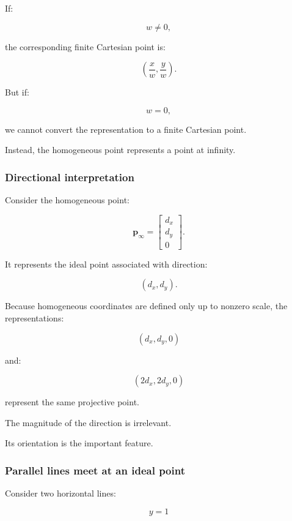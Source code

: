 If:

\[
 w\ne0,
\]

the corresponding finite Cartesian point is:

\[
 \boxed{ \left(\frac xw,\frac yw\right) }.
\]

But if:

\[
 \boxed{w=0},
\]

we cannot convert the representation to a finite Cartesian point.

Instead, the homogeneous point represents a point at infinity.

\subsubsection{Directional interpretation}\label{02-foundations-ii-ch032-directional-interpretation}

\hypertarget{02-foundations-ii-ch032-directional-interpretation}{}

Consider the homogeneous point:

\[
 \boxed{ \mathbf p_\infty= \begin{bmatrix} d_x\\d_y\\0 \end{bmatrix} }.
\]

It represents the ideal point associated with direction:

\[
 (d_x,d_y).
\]

Because homogeneous coordinates are defined only up to nonzero scale, the representations:

\[
 (d_x,d_y,0)
\]

and:

\[
 (2d_x,2d_y,0)
\]

represent the same projective point.

The magnitude of the direction is irrelevant.

Its orientation is the important feature.

\subsubsection{Parallel lines meet at an ideal point}\label{02-foundations-ii-ch032-parallel-lines-meet-at-an-ideal-point}

\hypertarget{02-foundations-ii-ch032-parallel-lines-meet-at-an-ideal-point}{}

Consider two horizontal lines:

\[
 y=1
\]

